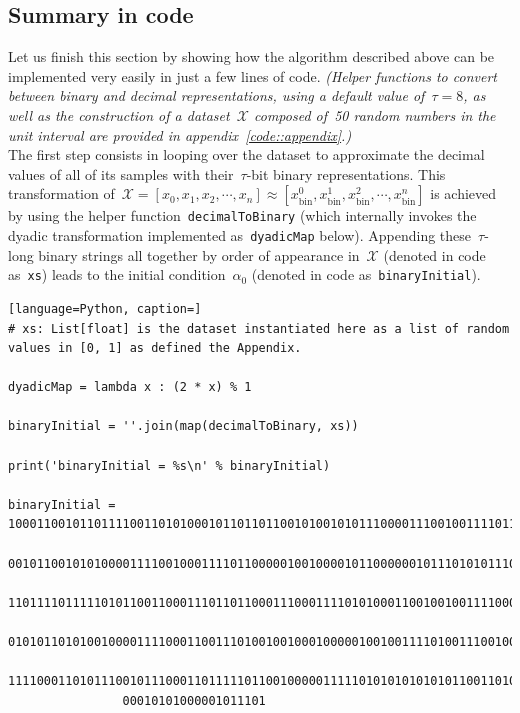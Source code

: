 \documentclass{article}
\begin{document}
\subsection{Summary in code}
\label{codeSummary::1}

\noindent Let us finish this section by showing how the algorithm described above can be implemented very easily in just a few lines of code. {\it (Helper functions to convert between binary and decimal representations, using a default value of~$\tau=8$, as well as the construction of a dataset~$\mathcal{X}$ composed of~50 random numbers in the unit interval are provided in appendix~\ref{code::appendix}.)} \\

\noindent The first step consists in looping over the dataset to approximate the decimal values of all of its samples with their~$\tau$-bit binary representations.  This transformation of~$\mathcal{X} = [x_0, x_1, x_2, \cdots, x_n] \approx [x_\text{bin}^0, x_\text{bin}^1,x_\text{bin}^2,\cdots,x_\text{bin}^n ]$ is achieved by using the helper function~\texttt{decimalToBinary} (which internally invokes the dyadic transformation implemented as~\texttt{dyadicMap} below). Appending these~$\tau$-long binary strings all together by order of appearance in~$\mathcal{X}$ (denoted in code as~\texttt{xs}) leads to the initial condition~$\alpha_0$ (denoted in code as~\texttt{binaryInitial}). \\
\begin{lstlisting}[language=Python, caption=]
# xs: List[float] is the dataset instantiated here as a list of random values in [0, 1] as defined the Appendix.

dyadicMap = lambda x : (2 * x) % 1

binaryInitial = ''.join(map(decimalToBinary, xs))

print('binaryInitial = %s\n' % binaryInitial)

binaryInitial = 1000110010110111100110101000101101101100101001010111000011100100111101100110
                0010110010101000011110010001111011000001001000010110000001011101010111000111
                1101111011111010110011000111011011000111000111101010001100100100111100011000
                0101011010100100001111000110011101001001000100000100100111101001110010011101
                1111000110101110010111000110111110110010000011111010101010101011001101010010
                00010101000001011101

\end{lstlisting}
\end{document}
